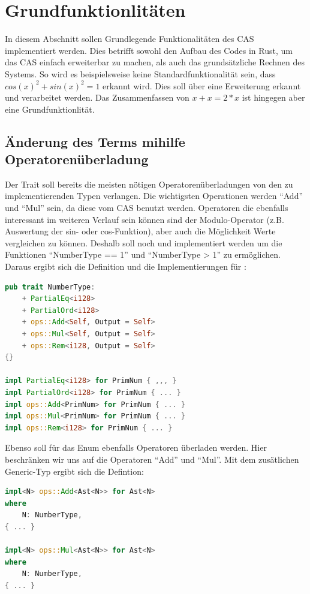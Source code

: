 \documentclass[11pt,a4paper, ngerman]{article}
\begin{document}
\newpage

\section{Grundfunktionlitäten}
In diesem Abschnitt sollen Grundlegende Funktionalitäten des CAS implementiert werden. Dies betrifft sowohl den Aufbau des Codes in Rust, um das CAS einfach erweiterbar zu machen, als auch das grundsätzliche Rechnen des Systems. So wird es beispielsweise keine Standardfunktionalität sein, dass $cos(x)^2+sin(x)^2 = 1$ erkannt wird. Dies soll über eine Erweiterung erkannt und verarbeitet werden. Das Zusammenfassen von $x+x=2*x$ ist hingegen aber eine Grundfunktionlität.

\subsection{Änderung des Terms mihilfe Operatorenüberladung}
Der Trait  soll bereits die meisten nötigen Operatorenüberladungen von den zu implementierenden Typen verlangen. Die wichtigsten Operationen werden ``Add'' und ``Mul'' sein, da diese vom CAS benutzt werden. Operatoren die ebenfalls interessant im weiteren Verlauf sein können sind der Modulo-Operator (z.B. Auswertung der sin- oder cos-Funktion), aber auch die Möglichkeit Werte vergleichen zu können. Deshalb soll noch  und  implementiert werden um die Funktionen ``NumberType == 1'' und ``NumberType > 1'' zu ermöglichen. Daraus ergibt sich die Definition und die Implementierungen für :

\begin{lstlisting}[language=rust, caption={trait NumberType 1. Iteration}]
pub trait NumberType:
    + PartialEq<i128>
    + PartialOrd<i128>
    + ops::Add<Self, Output = Self>
    + ops::Mul<Self, Output = Self>
    + ops::Rem<i128, Output = Self>
{}

impl PartialEq<i128> for PrimNum { ,,, }
impl PartialOrd<i128> for PrimNum { ... }
impl ops::Add<PrimNum> for PrimNum { ... }
impl ops::Mul<PrimNum> for PrimNum { ... }
impl ops::Rem<i128> for PrimNum { ... }
\end{lstlisting}

Ebenso soll für das Enum  ebenfalls Operatoren überladen werden. Hier beschränken wir uns auf die Operatoren ``Add'' und ``Mul''. Mit dem zusätlichen Generic-Typ ergibt sich die Defintion:

\begin{lstlisting}[language=rust, caption={Ast Operatorenüberladung}]
impl<N> ops::Add<Ast<N>> for Ast<N>
where
    N: NumberType,
{ ... }

impl<N> ops::Mul<Ast<N>> for Ast<N>
where
    N: NumberType,
{ ... }
\end{lstlisting}
\end{document}
